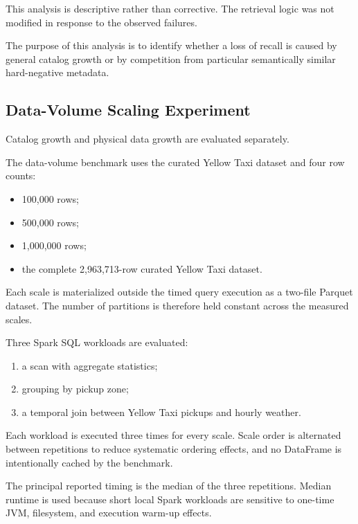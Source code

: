 This analysis is descriptive rather than corrective. The retrieval logic was
not modified in response to the observed failures.

The purpose of this analysis is to identify whether a loss of recall is caused
by general catalog growth or by competition from particular semantically
similar hard-negative metadata.


\subsection{Data-Volume Scaling Experiment}

Catalog growth and physical data growth are evaluated separately.

The data-volume benchmark uses the curated Yellow Taxi dataset and four row
counts:

\begin{itemize}

    \item 100,000 rows;
    \item 500,000 rows;
    \item 1,000,000 rows;
    \item the complete 2,963,713-row curated Yellow Taxi dataset.

\end{itemize}

Each scale is materialized outside the timed query execution as a two-file
Parquet dataset. The number of partitions is therefore held constant across
the measured scales.

Three Spark SQL workloads are evaluated:

\begin{enumerate}

    \item a scan with aggregate statistics;

    \item grouping by pickup zone;

    \item a temporal join between Yellow Taxi pickups and hourly weather.

\end{enumerate}

Each workload is executed three times for every scale. Scale order is
alternated between repetitions to reduce systematic ordering effects, and no
DataFrame is intentionally cached by the benchmark.

The principal reported timing is the median of the three repetitions. Median
runtime is used because short local Spark workloads are sensitive to
one-time JVM, filesystem, and execution warm-up effects.

